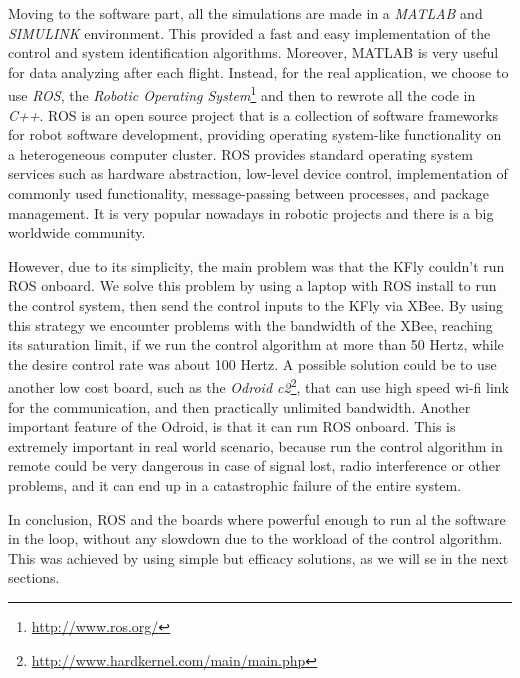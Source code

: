 \noindent Moving to the software part, all the simulations are made in a \textit{MATLAB} and \textit{SIMULINK} environment. This provided a fast and easy implementation of the control and system identification algorithms. Moreover, MATLAB is very useful for data analyzing after each flight. Instead, for the real application, we choose to use \textit{ROS}, the \textit{Robotic Operating System}\footnote{\url{http://www.ros.org/}} and then to rewrote all the code in \textit{C++}. ROS is an open source project that is a collection of software frameworks for robot software development, providing operating system-like functionality on a heterogeneous computer cluster. ROS provides standard operating system services such as hardware abstraction, low-level device control, implementation of commonly used functionality, message-passing between processes, and package management. It is very popular nowadays in robotic projects and there is a big worldwide community. 

\noindent However, due to its simplicity, the main problem was that the KFly couldn't run ROS onboard. We solve this problem by using a laptop with ROS install to run the control system, then send the control inputs to the KFly via XBee. By using this strategy we encounter problems with the bandwidth of the XBee, reaching its saturation limit, if we run the control algorithm at more than 50 Hertz, while the desire control rate was about 100 Hertz. A possible solution could be to use another low cost board, such as the \textit{Odroid c2}\footnote{\url{http://www.hardkernel.com/main/main.php}}, that can use high speed wi-fi link for the communication, and then practically unlimited bandwidth. Another important feature of the Odroid, is that it can run ROS onboard. This is extremely important in real world scenario, because run the control algorithm in remote could be very dangerous in case of signal lost, radio interference or other problems, and it can end up in a catastrophic failure of the entire system. 

\noindent In conclusion, ROS and the boards where powerful enough to run al the software in the loop, without any slowdown due to the workload of the control algorithm. This was achieved by using simple but efficacy solutions, as we will se in the next sections.   
